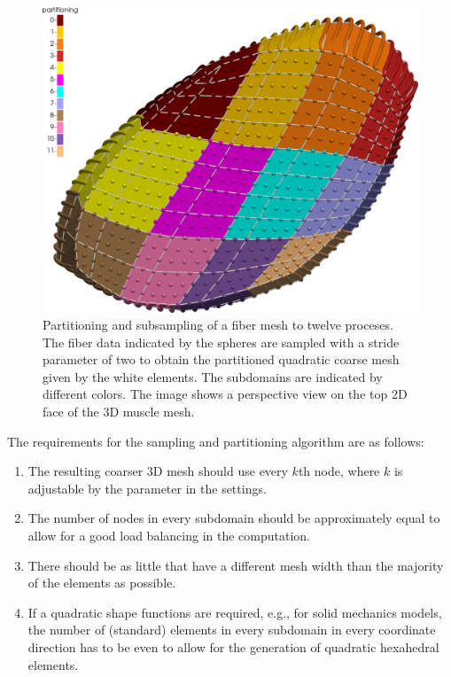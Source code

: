 \begin{figure}
  \centering%
  \includegraphics[width=\textwidth]{images/implementation/partitioning7.png}%
  \caption{Partitioning and subsampling of a fiber mesh to twelve proceses. The fiber data indicated by the spheres are sampled with a stride parameter of two to obtain the partitioned quadratic coarse mesh given by the white elements. The subdomains are indicated by different colors. The image shows a perspective view on the top 2D face of the 3D muscle mesh.}%
  \label{fig:partitioning1}%
\end{figure}%

The requirements for the sampling and partitioning algorithm are as follows: 
\begin{enumerate}[label=(\roman*)]
\item The resulting coarser 3D mesh should use every $k$th node, where $k$ is adjustable by the parameter  in the settings.
\item The number of nodes in every subdomain should be approximately equal to allow for a good load balancing in the computation.
\item There should be as little  that have a different mesh width than the majority of the elements as possible.
\item If a quadratic shape functions are required, e.g., for solid mechanics models, the number of (standard) elements in every subdomain in every coordinate direction has to be even to allow for the generation of quadratic hexahedral elements.
\end{enumerate}

